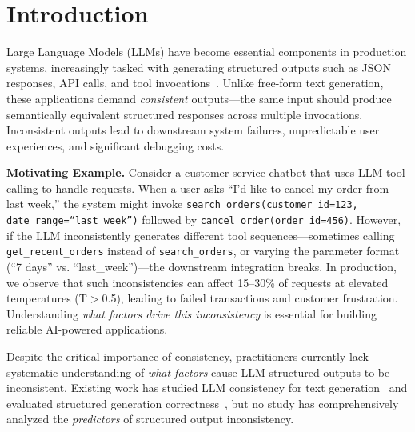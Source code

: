\documentclass[sigconf,anonymous,review]{acmart}
\begin{document}
\maketitle

\section{Introduction}
\label{sec:intro}

Large Language Models (LLMs) have become essential components in production systems, increasingly tasked with generating structured outputs such as JSON responses, API calls, and tool invocations~\cite{patil2023gorilla,schick2024toolformer}. Unlike free-form text generation, these applications demand \textit{consistent} outputs---the same input should produce semantically equivalent structured responses across multiple invocations. Inconsistent outputs lead to downstream system failures, unpredictable user experiences, and significant debugging costs.

\textbf{Motivating Example.} Consider a customer service chatbot that uses LLM tool-calling to handle requests. When a user asks ``I'd like to cancel my order from last week,'' the system might invoke \texttt{search\_orders(customer\_id=123, date\_range=``last\_week'')} followed by \texttt{cancel\_order(order\_id=456)}. However, if the LLM inconsistently generates different tool sequences---sometimes calling \texttt{get\_recent\_orders} instead of \texttt{search\_orders}, or varying the parameter format (``7 days'' vs. ``last\_week'')---the downstream integration breaks. In production, we observe that such inconsistencies can affect 15--30\% of requests at elevated temperatures (T$>$0.5), leading to failed transactions and customer frustration. Understanding \textit{what factors drive this inconsistency} is essential for building reliable AI-powered applications.

Despite the critical importance of consistency, practitioners currently lack systematic understanding of \textit{what factors} cause LLM structured outputs to be inconsistent. Existing work has studied LLM consistency for text generation~\cite{atil2024llmconsistency,renze2024effect} and evaluated structured generation correctness~\cite{geng2025jsonschema}, but no study has comprehensively analyzed the \textit{predictors} of structured output inconsistency.
\end{document}

